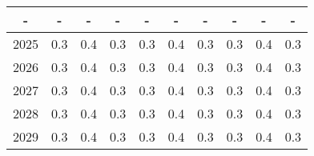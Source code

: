 \begin{table}
\begin{tabular}{|l|l|l|l|l|l|l|l|l|l|}
\multicolumn{1}{|c}{-} & \multicolumn{1}{c}{-} & \multicolumn{1}{c}{-} & \multicolumn{1}{c}{-} & \multicolumn{1}{c}{-} & \multicolumn{1}{c}{-} & \multicolumn{1}{c}{-} & \multicolumn{1}{c}{-} & \multicolumn{1}{c}{-} & \multicolumn{1}{c|}{-} \\ 
\hline
\multicolumn{1}{|c|}{2025} & \multicolumn{1}{c|}{0.3} & \multicolumn{1}{c|}{0.4} & \multicolumn{1}{c|}{0.3} & \multicolumn{1}{c|}{0.3} & \multicolumn{1}{c|}{0.4} & \multicolumn{1}{c|}{0.3} & \multicolumn{1}{c|}{0.3} & \multicolumn{1}{c|}{0.4} & \multicolumn{1}{c|}{0.3} \\ 
\hline
\multicolumn{1}{|c|}{2026} & \multicolumn{1}{c|}{0.3} & \multicolumn{1}{c|}{0.4} & \multicolumn{1}{c|}{0.3} & \multicolumn{1}{c|}{0.3} & \multicolumn{1}{c|}{0.4} & \multicolumn{1}{c|}{0.3} & \multicolumn{1}{c|}{0.3} & \multicolumn{1}{c|}{0.4} & \multicolumn{1}{c|}{0.3} \\ 
\hline
\multicolumn{1}{|c|}{2027} & \multicolumn{1}{c|}{0.3} & \multicolumn{1}{c|}{0.4} & \multicolumn{1}{c|}{0.3} & \multicolumn{1}{c|}{0.3} & \multicolumn{1}{c|}{0.4} & \multicolumn{1}{c|}{0.3} & \multicolumn{1}{c|}{0.3} & \multicolumn{1}{c|}{0.4} & \multicolumn{1}{c|}{0.3} \\ 
\hline
\multicolumn{1}{|c|}{2028} & \multicolumn{1}{c|}{0.3} & \multicolumn{1}{c|}{0.4} & \multicolumn{1}{c|}{0.3} & \multicolumn{1}{c|}{0.3} & \multicolumn{1}{c|}{0.4} & \multicolumn{1}{c|}{0.3} & \multicolumn{1}{c|}{0.3} & \multicolumn{1}{c|}{0.4} & \multicolumn{1}{c|}{0.3} \\ 
\hline
\multicolumn{1}{|c|}{2029} & \multicolumn{1}{c|}{0.3} & \multicolumn{1}{c|}{0.4} & \multicolumn{1}{c|}{0.3} & \multicolumn{1}{c|}{0.3} & \multicolumn{1}{c|}{0.4} & \multicolumn{1}{c|}{0.3} & \multicolumn{1}{c|}{0.3} & \multicolumn{1}{c|}{0.4} & \multicolumn{1}{c|}{0.3} \\ 
\hline
\end{tabular}
\end{table}

